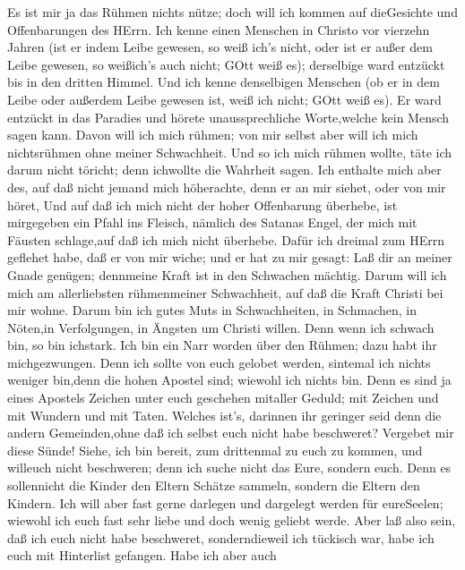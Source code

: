  Es ist mir ja das Rühmen nichts nütze; doch will ich kommen
auf dieGesichte und Offenbarungen des HErrn.  Ich kenne
einen Menschen in Christo vor vierzehn Jahren (ist er indem Leibe
gewesen, so weiß ich's nicht, oder ist er außer dem Leibe gewesen, so
weißich's auch nicht; GOtt weiß es); derselbige ward entzückt bis in den
dritten Himmel.  Und ich kenne denselbigen Menschen (ob er
in dem Leibe oder außerdem Leibe gewesen ist, weiß ich nicht; GOtt weiß
es).  Er ward entzückt in das Paradies und hörete
unaussprechliche Worte,welche kein Mensch sagen kann.  Davon
will ich mich rühmen; von mir selbst aber will ich mich nichtsrühmen
ohne meiner Schwachheit.  Und so ich mich rühmen wollte,
täte ich darum nicht töricht; denn ichwollte die Wahrheit sagen. Ich
enthalte mich aber des, auf daß nicht jemand mich höherachte, denn er an
mir siehet, oder von mir höret,  Und auf daß ich mich nicht
der hoher Offenbarung überhebe, ist mirgegeben ein Pfahl ins Fleisch,
nämlich des Satanas Engel, der mich mit Fäusten schlage,auf daß ich mich
nicht überhebe.  Dafür ich dreimal zum HErrn geflehet habe,
daß er von mir wiche;  und er hat zu mir gesagt: Laß dir an
meiner Gnade genügen; dennmeine Kraft ist in den Schwachen mächtig.
Darum will ich mich am allerliebsten rühmenmeiner Schwachheit, auf daß
die Kraft Christi bei mir wohne.  Darum bin ich gutes Muts
in Schwachheiten, in Schmachen, in Nöten,in Verfolgungen, in Ängsten um
Christi willen. Denn wenn ich schwach bin, so bin ichstark.
 Ich bin ein Narr worden über den Rühmen; dazu habt ihr
michgezwungen. Denn ich sollte von euch gelobet werden, sintemal ich
nichts weniger bin,denn die hohen Apostel sind; wiewohl ich nichts bin.
 Denn es sind ja eines Apostels Zeichen unter euch
geschehen mitaller Geduld; mit Zeichen und mit Wundern und mit Taten.
 Welches ist's, darinnen ihr geringer seid denn die andern
Gemeinden,ohne daß ich selbst euch nicht habe beschweret? Vergebet mir
diese Sünde!  Siehe, ich bin bereit, zum drittenmal zu euch
zu kommen, und willeuch nicht beschweren; denn ich suche nicht das Eure,
sondern euch. Denn es sollennicht die Kinder den Eltern Schätze sammeln,
sondern die Eltern den Kindern.  Ich will aber fast gerne
darlegen und dargelegt werden für eureSeelen; wiewohl ich euch fast sehr
liebe und doch wenig geliebt werde.  Aber laß also sein,
daß ich euch nicht habe beschweret, sonderndieweil ich tückisch war,
habe ich euch mit Hinterlist gefangen.  Habe ich aber auch
